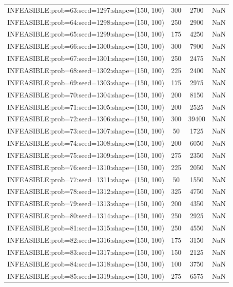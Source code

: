 \begin{longtable}{lccc}
INFEASIBLE:prob=63:seed=1297:shape=(150, 100)  &      300 &  2700 &    NaN \\
INFEASIBLE:prob=64:seed=1298:shape=(150, 100)  &      250 &  2900 &    NaN \\
INFEASIBLE:prob=65:seed=1299:shape=(150, 100)  &      175 &  4250 &    NaN \\
INFEASIBLE:prob=66:seed=1300:shape=(150, 100)  &      300 &  7900 &    NaN \\
INFEASIBLE:prob=67:seed=1301:shape=(150, 100)  &      250 &  2475 &    NaN \\
INFEASIBLE:prob=68:seed=1302:shape=(150, 100)  &      225 &  2400 &    NaN \\
INFEASIBLE:prob=69:seed=1303:shape=(150, 100)  &      175 &  2975 &    NaN \\
INFEASIBLE:prob=70:seed=1304:shape=(150, 100)  &      200 &  8150 &    NaN \\
INFEASIBLE:prob=71:seed=1305:shape=(150, 100)  &      200 &  2525 &    NaN \\
INFEASIBLE:prob=72:seed=1306:shape=(150, 100)  &      300 & 39400 &    NaN \\
INFEASIBLE:prob=73:seed=1307:shape=(150, 100)  &       50 &  1725 &    NaN \\
INFEASIBLE:prob=74:seed=1308:shape=(150, 100)  &      200 &  6050 &    NaN \\
INFEASIBLE:prob=75:seed=1309:shape=(150, 100)  &      275 &  2350 &    NaN \\
INFEASIBLE:prob=76:seed=1310:shape=(150, 100)  &      225 &  2050 &    NaN \\
INFEASIBLE:prob=77:seed=1311:shape=(150, 100)  &       50 &  1550 &    NaN \\
INFEASIBLE:prob=78:seed=1312:shape=(150, 100)  &      325 &  4750 &    NaN \\
INFEASIBLE:prob=79:seed=1313:shape=(150, 100)  &      200 &  4350 &    NaN \\
INFEASIBLE:prob=80:seed=1314:shape=(150, 100)  &      250 &  2925 &    NaN \\
INFEASIBLE:prob=81:seed=1315:shape=(150, 100)  &      250 &  4550 &    NaN \\
INFEASIBLE:prob=82:seed=1316:shape=(150, 100)  &      175 &  3150 &    NaN \\
INFEASIBLE:prob=83:seed=1317:shape=(150, 100)  &      150 &  2125 &    NaN \\
INFEASIBLE:prob=84:seed=1318:shape=(150, 100)  &      100 &  3750 &    NaN \\
INFEASIBLE:prob=85:seed=1319:shape=(150, 100)  &      275 &  6575 &    NaN \\

\end{longtable}
